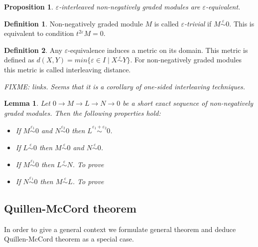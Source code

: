 \documentclass[a4paper, 12pt]{article}
\newtheorem{proposition}{Proposition}
\newtheorem{lemma}{Lemma}
\theoremstyle{definition}
\newtheorem{definition}{Definition}
\theoremstyle{remark}
\newcommand{\define}[1]{{\textit{#1}}}
\begin{document}
\begin{proposition}
  $\varepsilon$-interleaved non-negatively graded modules are $\varepsilon$-equivalent.
\end{proposition}

\begin{definition}
  Non-negatively graded module $M$ is called \define{$\varepsilon$-trivial} if $M \stackrel{\varepsilon}{\sim} 0$. This is equivalent to condition $t^{2\varepsilon}M = 0$.
\end{definition}

\begin{definition}
  Any $\varepsilon$-equivalence induces a metric on its domain. This metric is defined as $d(X,Y) = min\{\varepsilon \in I\;|\;X \stackrel{\varepsilon}{\sim} Y\}$. For non-negatively graded modules this metric is called interleaving distance. {\cite[Definition 2.12]{GS16}}
\end{definition}

\textit{FIXME: links. Seems that it is a corollary of one-sided interleaving techniques.}
\begin{lemma}
  Let $0 \to M \to L \to N \to 0$ be a short exact sequence of non-negatively graded modules. Then the following properties hold:
  \begin{itemize}
    \item If $M \stackrel{\varepsilon_1}{\sim} 0$ and $N \stackrel{\varepsilon_2}{\sim} 0$ then $L \stackrel{\varepsilon_1 + \varepsilon_2}{\sim} 0$. {\cite[Proposition 4.6]{GS16}}
    \item If $L \stackrel{\varepsilon}{\sim} 0$ then $M \stackrel{\varepsilon}{\sim} 0$ and $N \stackrel{\varepsilon}{\sim} 0$.
    \item If $M \stackrel{\varepsilon_1}{\sim} 0$ then $L \stackrel{\varepsilon}{\sim} N$. \textit{To prove}
    \item If $N \stackrel{\varepsilon_1}{\sim} 0$ then $M \stackrel{\varepsilon}{\sim} L$. \textit{To prove}
  \end{itemize}
\end{lemma}

\subsection{Quillen-McCord theorem}

In order to give a general context we formulate general theorem and deduce Quillen-McCord theorem as a special case.\\
\end{document}
